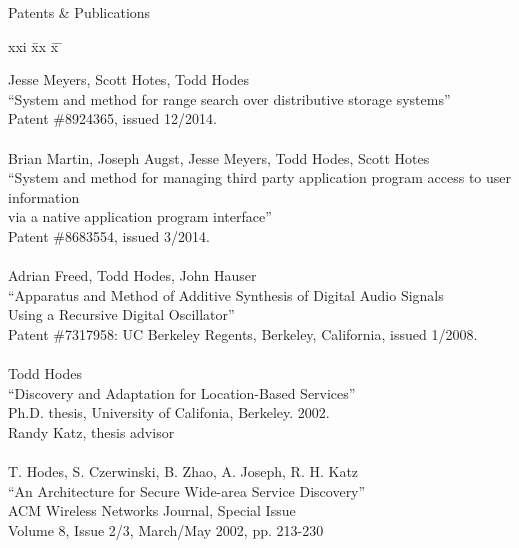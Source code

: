 \bigskip
\begin{bf} \large
Patents \& Publications
\end{bf}
\begin{tabbing}
xxi \= xx \= x \= \kill

\>    Jesse Meyers, Scott Hotes, Todd Hodes \\
\>\>      ``System and method for range search over distributive storage systems'' \\
\>\>    Patent \#8924365, issued 12/2014. \\

\smallskip \\[-3pt]
\>    Brian Martin, Joseph Augst, Jesse Meyers, Todd Hodes, Scott Hotes \\
\>\>      ``System and method for managing third party application program access to user information \\
\>\>      via a native application program interface'' \\
\>\>    Patent \#8683554, issued 3/2014. \\

\smallskip \\[-3pt]
\>    Adrian Freed, Todd Hodes, John Hauser \\
\>\>      ``Apparatus and Method of Additive Synthesis of Digital Audio Signals \\
\>\>   Using a Recursive Digital Oscillator'' \\
\>\>    Patent \#7317958: UC Berkeley Regents, Berkeley, California, issued 1/2008. \\

\smallskip \\[-3pt]
\>    Todd Hodes \\
\>\>      ``Discovery and Adaptation for Location-Based Services'' \\
\>\>    Ph.D. thesis, University of Califonia, Berkeley. 2002. \\
\>\>    Randy Katz, thesis advisor \\

\smallskip \\[-3pt]
\>    T. Hodes, S. Czerwinski, B. Zhao, A. Joseph, R. H. Katz \\
\>\>      ``An Architecture for Secure Wide-area Service Discovery'' \\
\>\>       ACM Wireless Networks Journal, Special Issue \\
\>\>       Volume 8, Issue 2/3, March/May 2002, pp. 213-230 \\


\end{tabbing}
